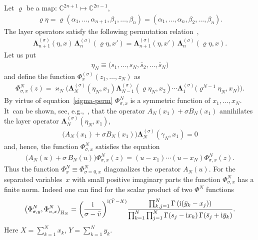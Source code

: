 Let $\varrho$ be a map: $\mathbb C^{2n+1}\mapsto \mathbb C^{2n-1}$,
\begin{gather*}
\varrho\eta=\varrho(\alpha_1,\dots,\alpha_{n+1},\beta_{1},\dots,\beta_n)
=(\alpha_1,\dots,\alpha_n,\beta_{2},\dots,\beta_{n}).
\end{gather*}
The layer operators satisfy the following permutation relation~\cite{Belitsky:2014rba},
\begin{gather}\label{sigma-perm}
\boldsymbol\Lambda^{(\sigma)}_{n+1}(\eta,x)\,\boldsymbol\Lambda^{(\sigma)}_n(\varrho\eta,x')
 =\boldsymbol\Lambda^{(\sigma)}_{n+1}(\eta,x')\,\boldsymbol\Lambda^{(\sigma)}_n(\varrho\eta,x).
\end{gather}
Let us put
\begin{gather}\label{gammaNAB}
\eta_N\equiv\big( s_1,\dots, s_N, \bar s_2,\dots, \bar s_N\big)
\end{gather}
and define the function $\Phi^{(\sigma)}_{{x}}(z_1,\dots,z_N)$ as
\begin{gather*}%
 \Phi^{N}_{\sigma,{x}}(z)=\varkappa_N \Big( \boldsymbol\Lambda^{(\sigma)}_N(\eta_N, x_1)
 \boldsymbol\Lambda^{(\sigma)}_{N-1}(\varrho\eta_N, x_2)\cdots \boldsymbol\Lambda^{(\sigma)}_1\big(\varrho^{N-1}\eta_N, x_{N}\big)\Big).
\end{gather*}
By virtue of equation~\eqref{sigma-perm} $ \Phi^{N}_{\sigma,{x}} $ is a symmetric function of $x_1,\dots,x_N$. It~can be shown, see, e.g.,~\cite{Derkachov:2002tf}, that the operator $A_N(x_1)+\sigma B_N(x_1)$ annihilates the layer operator $
\boldsymbol\Lambda^{(\sigma)}_N(\eta_N, x_1)$,
\begin{gather*}
\big(A_N(x_1)+\sigma B_N(x_1)\big)\boldsymbol\Lambda^{(\sigma)}_N(\gamma_N, x_1)=0
\end{gather*}
and, hence, the function $\Phi^N_{\sigma,{x}}$ satisfies the equation
\begin{gather*}
\big(A_N(u)+\sigma\, B_N(u)\big)\Phi^N_{\sigma,{x}}( z)=
(u-x_1)\cdots(u-x_N)\Phi^N_{\sigma,{x}}( z).
\end{gather*}
Thus the function $\Phi^N_{{x}}\equiv\Phi^N_{\sigma=0,{x}}$ diagonalizes the operator $A_N(u)$.
 For the
separated variables~$x$ with small positive imaginary parts the function $\Phi^N_{\sigma,x}$ has a finite norm. Indeed one can find for the
scalar product of two $\Phi^N$ functions~\cite{Belitsky:2014rba}
\begin{gather}
\label{s-product-T}
\big(\Phi^N_{\sigma, y}, \Phi^N_{\upsilon, x}\big)_{\mathbb H_N} =
 \bigg(\frac {\rm i}{\sigma-\bar\upsilon}\bigg)^{{\rm i}(\bar Y-X)}
\frac{\prod_{k,j=1}^N \Gamma\left({\rm i}(\bar y_k-x_j)\right)
}{\prod_{k=1}^{N}\prod_{j=1}^N\Gamma( s_j-{\rm i}x_k)\,\Gamma(\bar s_j+ {\rm i}\bar y_k)}.
\end{gather}
Here $X=\sum_{k=1}^N x_k$, $Y=\sum_{k=1}^N y_k$.
\smallskip

